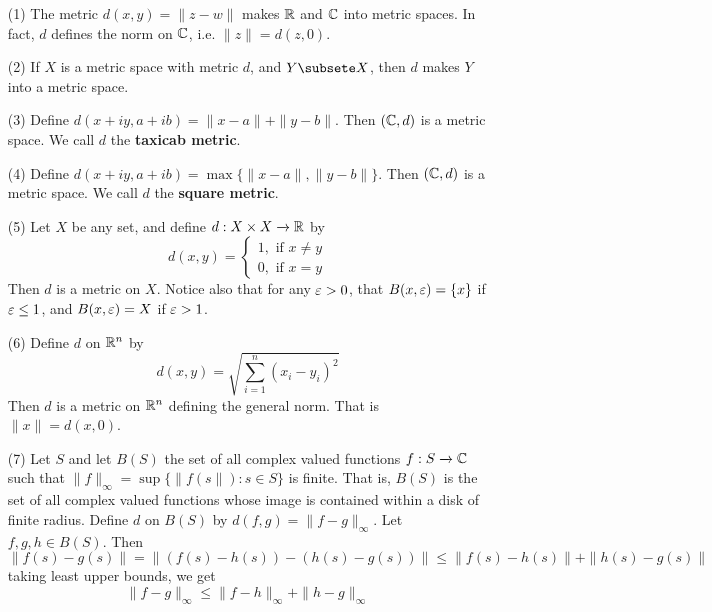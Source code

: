 \begin{example}\label{example_2.1}
    \begin{enumerate}
        \item[(1)] The metric $d(x,y)=\|z-w\|$ makes $\mathbb{R}$ and  $\mathbb{C}$ into metric
            spaces. In fact,  $d$ defines the norm on  $\mathbb{C}$, i.e.
            $\|z\|=d(z,0)$.

        \item[(2)] If $X$ is a metric space with metric  $d$, and  $Y \subsete
            X$, then  $d$ makes  $Y$ into a metric space.

        \item[(3)] Define $d(x+iy,a+ib)=\|x-a\|+\|y-b\|$. Then $(\mathbb{C},d)$ is a
            metric space. We call $d$ the  \textbf{taxicab metric}.

        \item[(4)] Define $d(x+iy,a+ib)=\max{\{\|x-a\|,\|y-b\|\}}$. Then
            $(\mathbb{C},d)$ is a metric space. We call $d$ the  \textbf{square metric}.

        \item[(5)] Let $X$ be any set, and define  $d:X \times X \xrightarrow{}
            \mathbb{R}$ by
            \begin{equation*}
                d(x,y)=\begin{cases}
                    1, \text{ if } x \neq y \\
                    0, \text{ if } x=y
                \end{cases}
            \end{equation*}
        Then $d$ is a metric on  $X$. Notice also that for any  $\varepsilon>0$, that
        $B(x,\varepsilon)=\{x\}$ if $\varepsilon \leq 1$, and  $B(x,\varepsilon)=X$ if $\varepsilon>1$.

    \item[(6)] Define $d$ on  $\mathbb{R}^n$ by
        \begin{equation*}
            d(x,y)=\sqrt{\sum_{i=1}^n{(x_i-y_i)^2}}
        \end{equation*}
        Then $d$ is a metric on $\mathbb{R}^n$ defining the general norm. That is
        $\|x\|=d(x,0)$.

    \item[(7)] Let $S$ and let  $B(S)$ the set of all complex valued functions
        $f:S \xrightarrow{} \mathbb{C}$ such that $\|f\|_\infty=\sup{\{\|f(s\|) : s \in
        S\}}$ is finite. That is, $B(S)$ is the set of all complex valued
        functions whose image is contained within a disk of finite radius.
        Define $d$ on  $B(S)$ by $d(f,g)=\|f-g\|_\infty$. Let $f,g,h \in B(S)$.
        Then
        \begin{equation*}
            \|f(s)-g(s)\|=\|(f(s)-h(s))-(h(s)-g(s))\| \leq
            \|f(s)-h(s)\|+\|h(s)-g(s)\|
        \end{equation*}
        taking least upper bounds, we get
        \begin{equation*}
            \|f-g\|_\infty \leq \|f-h\|_\infty+\|h-g\|_\infty
        \end{equation*}
    \end{enumerate}
\end{example}

